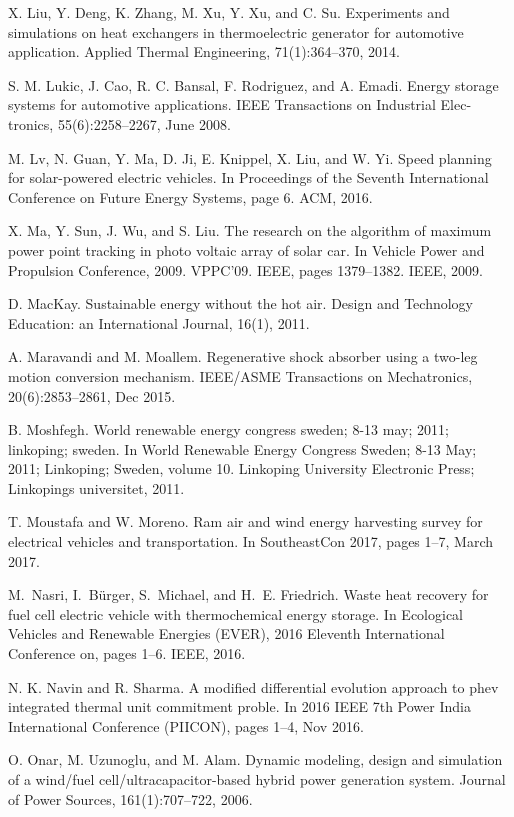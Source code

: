  X. Liu, Y. Deng, K. Zhang, M. Xu, Y. Xu, and C. Su. Experiments and simulations on heat exchangers in thermoelectric generator for automotive application.
Applied Thermal Engineering, 71(1):364--370, 2014.

 S. M. Lukic, J. Cao, R. C. Bansal, F. Rodriguez, and A. Emadi. Energy storage systems for automotive applications. IEEE Transactions on Industrial Elec-
tronics, 55(6):2258--2267, June 2008.

 M. Lv, N. Guan, Y. Ma, D. Ji, E. Knippel, X. Liu,
and W. Yi. Speed planning for solar-powered electric vehicles. In Proceedings of the Seventh International Conference on Future Energy Systems, page 6. ACM, 2016.

 X. Ma, Y. Sun, J. Wu, and S. Liu. The research on the algorithm of maximum power point tracking in photo voltaic array of solar car. In Vehicle Power and Propulsion Conference, 2009. VPPC’09. IEEE, pages 1379--1382. IEEE, 2009.

 D. MacKay. Sustainable energy without the hot air. Design and Technology Education: an International Journal, 16(1), 2011.

 A. Maravandi and M. Moallem. Regenerative shock
absorber using a two-leg motion conversion mechanism. IEEE/ASME Transactions on Mechatronics, 20(6):2853--2861, Dec 2015.

 B. Moshfegh. World renewable energy congress sweden; 8-13 may; 2011; linkoping; sweden. In World Renewable Energy Congress Sweden; 8-13 May; 2011; Linkoping; Sweden, volume 10. Linkoping University Electronic Press; Linkopings universitet, 2011.

 T. Moustafa and W. Moreno. Ram air and wind energy harvesting survey for electrical vehicles and transportation. In SoutheastCon 2017, pages 1--7, March 2017.

 M.~Nasri, I.~B{\"u}rger, S.~Michael, and H.~E. Friedrich.
Waste heat recovery for fuel cell electric vehicle with
  thermochemical energy storage.
In Ecological Vehicles and Renewable Energies (EVER), 2016
  Eleventh International Conference on, pages 1--6. IEEE, 2016.

 N. K. Navin and R. Sharma. A modified differential evolution approach to phev integrated thermal unit commitment proble. In 2016 IEEE 7th Power India International Conference (PIICON), pages 1--4, Nov 2016.

 O. Onar, M. Uzunoglu, and M. Alam. Dynamic modeling, design and simulation of a wind/fuel cell/ultracapacitor-based hybrid power generation system. Journal of Power Sources, 161(1):707--722, 2006.

